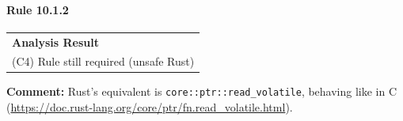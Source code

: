 \paragraph{Rule 10.1.2}
\begin{longtable}{p{13cm}}
\textbf{Analysis Result} \\
(C4) Rule still required (unsafe Rust) \\
\end{longtable}
\textbf{Comment:} Rust's equivalent is \texttt{core::ptr::read\_volatile}, behaving like in C (\url{https://doc.rust-lang.org/core/ptr/fn.read_volatile.html}). \\
